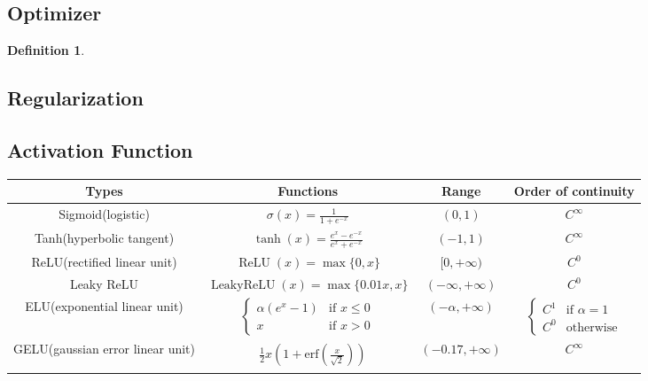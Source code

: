 \documentclass[a4paper]{article}
\theoremstyle{definition}
\newtheorem{definition}{Definition}
\theoremstyle{plain}
\begin{document}
\subsection{Optimizer}
\begin{definition}
\end{definition}
\subsection{Regularization}
\subsection{Activation Function}
\begin{table}[H]
\centering
\begin{tabular}{cccc}
\hline
\textbf{Types}                    & \textbf{Functions}                                       & \textbf{Range}                                           & \textbf{Order of continuity} \\ \hline
Sigmoid(logistic)        & $\sigma(x)=\frac {1}{1+e^{-x}}$               & $(0,1)$  & $C^\infty$\\
Tanh(hyperbolic tangent) & $\tanh(x)={\frac {e^{x}-e^{-x}}{e^{x}+e^{-x}}}$ & $(-1,1)$   & $C^\infty$\\
ReLU(rectified linear unit)  & $\operatorname{ReLU}(x)=\max\{0,x\}$            & $[0,+\infty)$    & $C^0$\\       
Leaky ReLU               & $\operatorname{Leaky ReLU}(x)=\max\{0.01x,x\}$  & $(-\infty,+\infty)$ & $C^0$\\
ELU(exponential linear unit)& ${\begin{cases}\alpha \left(e^{x}-1\right)&{\text{if }}x\leq 0\\x&{\text{if }}x>0\end{cases}}$ & $(-\alpha,+\infty)$ & $\begin{cases}C^{1}&{\text{if }}\alpha =1\\C^{0}&{\text{otherwise}}\end{cases}$\\ 
GELU(gaussian error linear unit)& $\begin{aligned}&{\frac {1}{2}}x\left(1+{\text{erf}}\left({\frac {x}{\sqrt {2}}}\right)\right)\end{aligned}$ & $(-0.17,+\infty)$ & $C^\infty$\\
\hline
\end{tabular}
\end{table}
\end{document}
